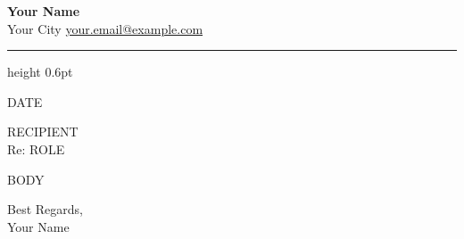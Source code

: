 \documentclass[11pt,a4paper]{article}
\begin{document}
{\LARGE\bfseries Your Name}\\[2pt]
{\small\color{rule}%
Your City \textbullet{}
\href{mailto:your.email@example.com}{your.email@example.com}}

\vspace{4pt}
{\color{rule}\hrule height 0.6pt}
\vspace{14pt}

{{DATE}}

{{RECIPIENT}}\\
Re: {{ROLE}}

\vspace{6pt}

{{BODY}}

\vspace{10pt}
Best Regards,\\[2pt]
Your Name
\end{document}
